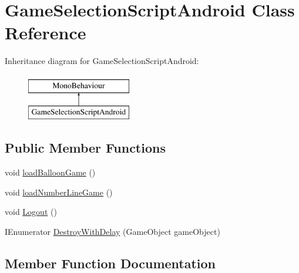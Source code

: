 \hypertarget{classGameSelectionScriptAndroid}{}\section{Game\+Selection\+Script\+Android Class Reference}
\label{classGameSelectionScriptAndroid}
Inheritance diagram for Game\+Selection\+Script\+Android\+:\begin{figure}[H]
\begin{center}
\leavevmode
\includegraphics[height=2.000000cm]{classGameSelectionScriptAndroid}
\end{center}
\end{figure}
\subsection*{Public Member Functions}
\begin{DoxyCompactItemize}
\item 
void \hyperlink{classGameSelectionScriptAndroid_a09965baf622a44fe076120b935ffdd19}{load\+Balloon\+Game} ()
\item 
void \hyperlink{classGameSelectionScriptAndroid_af4e6f539db2075feabf461cfc1dd46d3}{load\+Number\+Line\+Game} ()
\item 
void \hyperlink{classGameSelectionScriptAndroid_a3d4672995a51ea099f3952c8c575e65b}{Logout} ()
\item 
I\+Enumerator \hyperlink{classGameSelectionScriptAndroid_a7d00286f3426bba2ddaa40fdc12412cb}{Destroy\+With\+Delay} (Game\+Object game\+Object)
\end{DoxyCompactItemize}


\subsection{Member Function Documentation}
\mbox{\label{classGameSelectionScriptAndroid_a7d00286f3426bba2ddaa40fdc12412cb}} 

